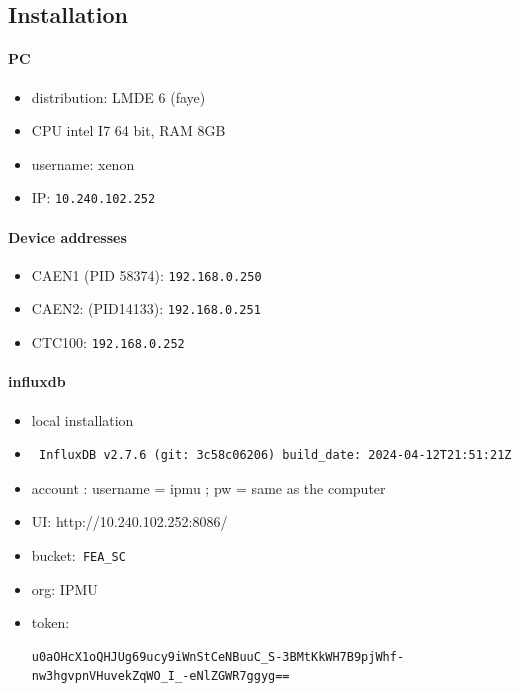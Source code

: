 \documentclass{article}
\begin{document}
\subsection{Installation}
\paragraph{PC}
\begin{itemize}
    \item distribution: LMDE 6 (faye)
    \item CPU intel I7 64 bit, RAM 8GB
    \item username: xenon
    \item IP: \verb|10.240.102.252|  
\end{itemize}

\paragraph{Device addresses}
\begin{itemize}
    \item CAEN1 (PID 58374): \verb|192.168.0.250|
    \item CAEN2: (PID14133): \verb|192.168.0.251|
    \item CTC100: \verb|192.168.0.252|
\end{itemize}

\paragraph{influxdb}
\begin{itemize}
    \item local installation
    \item \begin{verbatim} InfluxDB v2.7.6 (git: 3c58c06206) build_date: 2024-04-12T21:51:21Z \end{verbatim}
    \item account : username = ipmu ; pw = same as the computer
    \item UI: http://10.240.102.252:8086/
    \item bucket:\verb | FEA_SC |
    \item org: IPMU
    \item token: \begin{verbatim}u0aOHcX1oQHJUg69ucy9iWnStCeNBuuC_S-3BMtKkWH7B9pjWhf-nw3hgvpnVHuvekZqWO_I_-eNlZGWR7ggyg==\end{verbatim}
\end{itemize}
\end{document}
